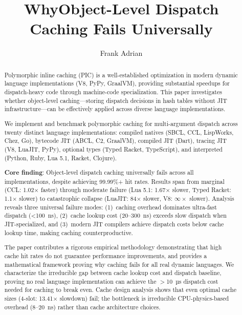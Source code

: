 \documentclass[sigplan,final]{acmart}
\begin{document}
\title{WhyObject-Level Dispatch Caching Fails Universally}

\author{Frank Adrian}

\begin{abstract}
  Polymorphic inline caching (PIC) is a well-established optimization in modern dynamic language
  implementations (V8, PyPy, GraalVM), providing substantial speedups for dispatch-heavy code
  through machine-code specialization. This paper investigates whether object-level caching—storing
  dispatch decisions in hash tables without JIT infrastructure—can be effectively applied across
  diverse language implementations.

  We implement and benchmark polymorphic caching for multi-argument dispatch across twenty
  distinct language implementations: compiled natives (SBCL, CCL, LispWorks, Chez, Go), bytecode JIT
  (ABCL, C2, GraalVM), compiled JIT (Dart), tracing JIT (V8, LuaJIT, PyPy), optional types (Typed Racket, TypeScript), and interpreted
  (Python, Ruby, Lua 5.1, Racket, Clojure).

  \textbf{Core finding}: Object-level dispatch caching universally fails across all implementations,
  despite achieving 99.99\%+ hit rates. Results span from marginal (CCL: 1.02× faster) through
  moderate failure (Lua 5.1: 1.67× slower, Typed Racket: 1.1× slower) to catastrophic collapse
  (LuaJIT: 84× slower, V8: $\infty \times$ slower). Analysis reveals three universal failure modes: (1)~caching
  overhead dominates ultra-fast dispatch (<100~ns), (2)~cache lookup cost (20--300~ns) exceeds
  slow dispatch when JIT-specialized, and (3)~modern JIT compilers achieve dispatch costs below
  cache lookup time, making caching counterproductive.

  The paper contributes a rigorous empirical methodology demonstrating that high cache hit rates
  do not guarantee performance improvements, and provides a mathematical framework proving why
  caching fails for all real dynamic languages. We characterize the irreducible gap between cache
  lookup cost and dispatch baseline, proving no real language implementation can achieve the
  $>$10~µs dispatch cost needed for caching to break even. Cache design analysis shows that even
  optimal cache sizes (4-slot: 13.41× slowdown) fail; the bottleneck is irreducible CPU-physics-based
  overhead (8--20~ns) rather than cache architecture choices.
\end{abstract}
\end{document}

